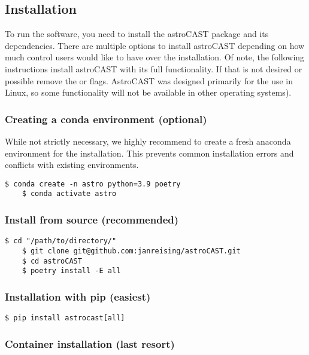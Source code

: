 \subsection{Installation}
To run the software, you need to install the astroCAST package and its dependencies. There are multiple options to install \ac{astroCAST} depending on how much control users would like to have over the installation. Of note, the following instructions install astroCAST with its full functionality. If that is not desired or possible remove the  or \inlineBash{[all]} flags. AstroCAST was designed primarily for the use in Linux, so some functionality will not be available in other operating systems).

\subsubsection{Creating a conda environment (optional)}
While not strictly necessary, we highly recommend to create a fresh anaconda environment for the installation. This
prevents common installation errors and conflicts with existing environments.

\begin{lstlisting}[style=bashStyle]
    $ conda create -n astro python=3.9 poetry
    $ conda activate astro
\end{lstlisting}

\subsubsection{Install from source (recommended)}
\label{res:install-from-source}
\begin{lstlisting}[style=bashStyle]
    $ cd "/path/to/directory/"
    $ git clone git@github.com:janreising/astroCAST.git
    $ cd astroCAST
    $ poetry install -E all
\end{lstlisting}

\subsubsection{Installation with pip (easiest)}
\begin{lstlisting}[style=bashStyle]
    $ pip install astrocast[all]
\end{lstlisting}

\subsubsection{Container installation (last resort)}


